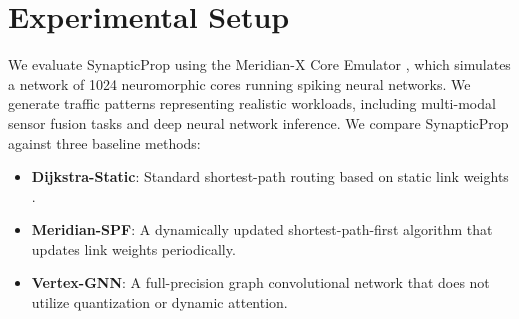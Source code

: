 \section{Experimental Setup}
\label{sec:experiments}
We evaluate SynapticProp using the Meridian-X Core Emulator \citep{chen2023meridian}, which simulates a network of 1024 neuromorphic cores running spiking neural networks. We generate traffic patterns representing realistic workloads, including multi-modal sensor fusion tasks and deep neural network inference. We compare SynapticProp against three baseline methods:
\begin{itemize}
    \item \textbf{Dijkstra-Static}: Standard shortest-path routing based on static link weights \citep{thompson2022dynamic}.
    \item \textbf{Meridian-SPF}: A dynamically updated shortest-path-first algorithm that updates link weights periodically.
    \item \textbf{Vertex-GNN}: A full-precision graph convolutional network that does not utilize quantization or dynamic attention.
\end{itemize}

